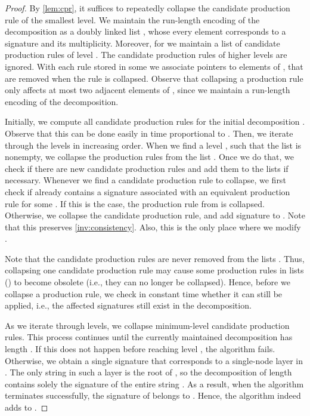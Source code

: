 \documentclass[a4paper]{article}
\theoremstyle{remark}
\begin{document}
\begin{proof}
By \cref{lem:cpr}, it suffices to repeatedly collapse the candidate production rule of the smallest level.
We maintain the run-length encoding of the decomposition  as a doubly linked list , whose every element corresponds to a signature and its multiplicity.
Moreover, for  we maintain a list  of candidate production rules of level .
The candidate production rules of higher levels are ignored.
With each rule stored in some  we associate pointers to elements of , that are removed when the rule is collapsed.
Observe that collapsing a production rule only affects at most two adjacent elements of , since we maintain a run-length encoding of the decomposition.

Initially, we compute all candidate production rules for the initial decomposition .
Observe that this can be done easily in time proportional to .
Then, we iterate through the levels in increasing order.
When we find a level , such that the list  is nonempty, we collapse the production rules from the list .
Once we do that, we check if there are new candidate production rules and add them to the lists  if necessary.
Whenever we find a candidate production rule  to collapse, we first check if  already contains a signature  associated with an equivalent production rule  for some .
If this is the case, the production rule from  is collapsed.
Otherwise, we collapse the candidate production rule, and add signature  to .
Note that this preserves \cref{inv:consistency}.
Also, this is the only place where we modify .

Note that the candidate production rules are never removed from the lists .
Thus, collapsing one candidate production rule may cause some production rules in lists  () to become obsolete (i.e., they can no longer be collapsed).
Hence, before we collapse a production rule, we check in constant time whether it can still be applied, i.e., the affected signatures still exist in the decomposition.

As we iterate through levels, we collapse minimum-level candidate production rules.
This process continues until the currently maintained decomposition has length .
If this does not happen before reaching level , the algorithm fails.
Otherwise, we obtain a single signature that corresponds to a single-node layer in .
The only string in such a layer is the root of , so the decomposition of length  contains solely the signature of the entire string .
As a result, when the algorithm terminates successfully, the signature of  belongs to .
Hence, the algorithm indeed adds  to .


\end{proof}
\end{document}

